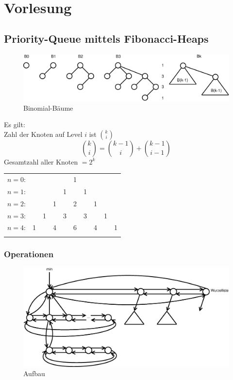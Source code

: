 \chapter{Vorlesung}
\section{Priority-Queue mittels Fibonacci-Heaps}
\begin{figure}[h]
	\centering
	\includegraphics[width=0.65\linewidth]{21/Grafik/BinomialBaeume}
	\caption{Binomial-Bäume}
\end{figure}

Es gilt:\\
Zahl der Knoten auf Level $i$ ist $\binom{k}{i}$
\[  \binom{k}{i} = \binom{k-1}{i} + \binom{k-1}{i-1} \]
Gesamtzahl aller Knoten $=2^k$\\

\begin{tabular}{rccccccccc}
$n=0$:&    &    &    &    &  1\\\noalign{\smallskip\smallskip}
$n=1$:&    &    &    &  1 &    &  1\\\noalign{\smallskip\smallskip}
$n=2$:&    &    &  1 &    &  2 &    &  1\\\noalign{\smallskip\smallskip}
$n=3$:&    &  1 &    &  3 &    &  3 &    &  1\\\noalign{\smallskip\smallskip}
$n=4$:&  1 &    &  4 &    &  6 &    &  4 &    &  1\\\noalign{\smallskip\smallskip}
\end{tabular}


\subsection{Operationen}

\begin{figure}[h]
	\centering
	\includegraphics[width=0.65\linewidth]{21/Grafik/Aufbau}
	\caption{Aufbau}
\end{figure}

